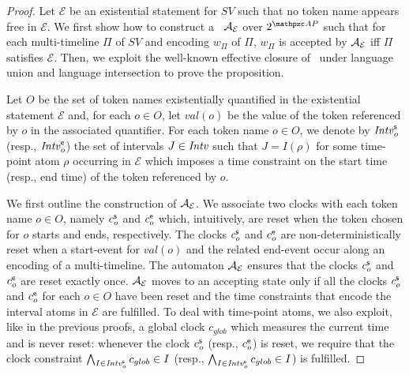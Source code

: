  \begin{proof} Let $\mathcal{E}$ be an existential statement for $SV$ such that no token name appears free in $\mathcal{E}$. We first show how to construct
  a \TA\ $\mathcal{A}_{\mathcal{E}}$ over $2^{\Prop}$  such that for each multi-timeline $\Pi$ of $SV$ and encoding $w_\Pi$ of $\Pi$, $w_\Pi$ is accepted by $\mathcal{A}_{\mathcal{E}}$
  iff $\Pi$ satisfies $\mathcal{E}$. Then,  we exploit the well-known effective closure of \TA\ under language union and language intersection to prove the proposition.


Let $O$ be the set of token names existentially quantified
in the existential statement $\mathcal{E}$ and,  for each $o\in O$, let $val(o)$ be  the value of the token referenced by
$o$ in the associated quantifier. For each token name $o\in  O$, we denote by ${\mathit{Intv}}_o^{\mathsf{s}}$ (resp., ${\mathit{Intv}}_o^{\mathsf{e}}$) the set of intervals $J\in{\mathit{Intv}}$ such that $J=I(\rho)$ for some time-point atom $\rho$ occurring in  $\mathcal{E}$ which imposes a time constraint on the start time (resp., end time) of the token referenced by $o$.

We first outline the construction of  $\mathcal{A}_{\mathcal{E}}$. We associate two clocks with  each token name $o\in O$,
namely $c_o^{\mathsf{s}}$ and $c_o^{\mathsf{e}}$ which, intuitively, are reset when the token chosen for $o$ starts and ends, respectively.
The clocks $c_o^{\mathsf{s}}$ and $c_o^{\mathsf{e}}$ are non-deterministically reset when a start-event for $val(o)$ and the related end-event occur along an encoding of a multi-timeline.
The automaton $\mathcal{A}_{\mathcal{E}}$ ensures that the clocks $c_o^{\mathsf{s}}$ and $c_o^{\mathsf{e}}$ are reset exactly once.
$\mathcal{A}_{\mathcal{E}}$ moves to an accepting state only if all the clocks $c_o^{\mathsf{s}}$ and $c_o^{\mathsf{e}}$ for each $o\in O$ have been reset and the time constraints that encode the interval atoms in $\mathcal{E}$ are fulfilled.
To deal with time-point atoms, we also exploit, like in the previous proofs, a global clock $c_{glob}$ which measures the current time and is never reset: whenever the clock $c_o^{\mathsf{s}}$ (resp., $c_o^{\mathsf{e}}$) is reset, we require that the clock constraint
  $\bigwedge_{I\in {\mathit{Intv}}_o^{\mathsf{s}} } c_{glob}\in I$ (resp., $\bigwedge_{I\in {\mathit{Intv}}_o^{\mathsf{e}} } c_{glob}\in I$) is fulfilled.



\end{proof}
